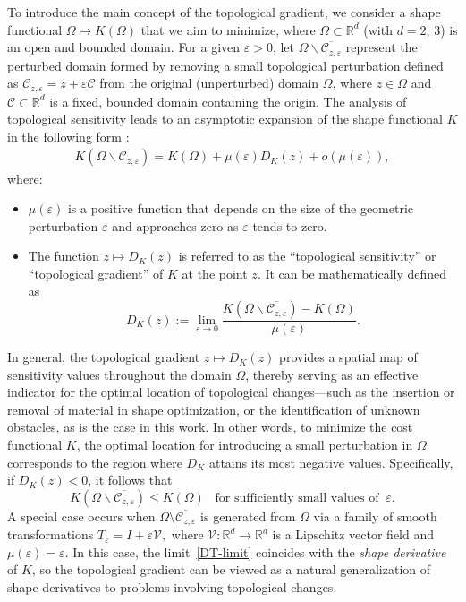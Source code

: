 \documentclass[a4paper,12pt,reqno,natbib]{amsart}
\begin{document}
\noindent To introduce the main concept of the topological gradient, we consider a shape functional  $\Omega\longmapsto K(\Omega)$ that we aim to minimize, where $\Omega\subset\mathbb{R}^d$ (with $d=2,\,3$) is an open and bounded domain. For a given $\varepsilon>0$, let 
$\Omega\backslash\overline{\mathcal{C}_{z,\varepsilon}}$ represent the perturbed domain formed by removing a small topological perturbation defined as $\mathcal{C}_{z,\varepsilon}=z+\varepsilon\mathcal{C}$  from the original (unperturbed) domain $\Omega$, where $z\in\Omega$ and $\mathcal{C}\subset\mathbb{R}^d$ is a fixed, bounded domain containing the origin. The analysis of topological sensitivity leads to an asymptotic expansion of the shape functional $K$ in the following form :
\begin{align}\label{asy}
K(\Omega\backslash\overline{\mathcal{C}_{z,\varepsilon}})=K(\Omega)+\mu(\varepsilon)D_K(z)+o(\mu(\varepsilon)),
\end{align}
where:
\begin{itemize}
\item $\mu(\varepsilon)$ is a positive function that depends on the size of the geometric perturbation $\varepsilon$ and approaches zero as $\varepsilon$ tends to zero.
\item The function $z\mapsto D_K(z)$ is referred to as the ``topological sensitivity'' or ``topological gradient'' of $K$ at the point $z$. It can be mathematically defined as
\begin{equation}\label{DT-limit}
D_K(z):=\lim_{\varepsilon\rightarrow0}\frac{K(\Omega\backslash\overline{\mathcal{C}_{z,\varepsilon}})-K(\Omega)}{\mu(\varepsilon)}.
\end{equation}
\end{itemize}
In general, the topological gradient $z \mapsto D_K(z)$ provides a spatial map of sensitivity values throughout the domain $\Omega$, thereby serving as an effective indicator for the optimal location of topological changes---such as the insertion or removal of material in shape optimization, or the identification of unknown obstacles, as is the case in this work. In other words, to minimize the cost functional $K$, the optimal location for introducing a small perturbation in $\Omega$ corresponds to the region where $D_K$ attains its most negative values. Specifically, if $D_K(z)<0$, it follows that $$K(\Omega\backslash\overline{\mathcal{C}_{z,\varepsilon}})\leq
K(\Omega)\;\;\; \text{for sufficiently small values of}\;\; \varepsilon.$$ 
A special case occurs when \(\Omega \setminus \overline{\mathcal{C}_{z,\varepsilon}}\) is generated from \(\Omega\) via a family of smooth transformations  
\(
T_\varepsilon = I + \varepsilon \mathcal{V},
\) 
where \(\mathcal{V} : \mathbb{R}^d \to \mathbb{R}^d\) is a Lipschitz vector field and \(\mu(\varepsilon) = \varepsilon\).  
In this case, the limit~\eqref{DT-limit} coincides with the \emph{shape derivative} of \(K\), so the topological gradient can be viewed as a natural generalization of shape derivatives to problems involving topological changes.
\end{document}
